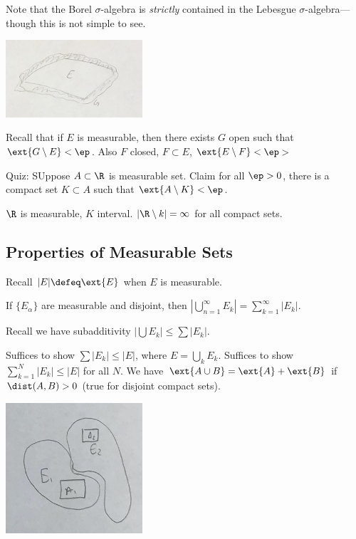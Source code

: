 Note that the Borel $\sigma$-algebra is \emph{strictly} contained in the Lebesgue $\sigma$-algebra---though this is not simple to see. 











   \includegraphics[width=2in]{rep1.png} 


Recall that if $E$ is measurable, then there exists $G$ open such that $\ext{G\setminus E}<\ep$. Also $F$ closed, $F \subset E$, $\ext{E\setminus F}<\ep$> 

Quiz: SUppose $A \subset \R$ is measurable set. Claim for all $\ep>0$, there is a compact set $K \subset A$ such that $\ext{A \setminus K}<\ep$. 

$\R$ is measurable, $K$ interval. $|\R \setminus k|=\infty$ for all compact sets. 




\subsection{Properties of Measurable Sets}

Recall $|E| \defeq \ext{E}$ when $E$ is measurable. 

\begin{thm}
If $\{E_\alpha\}$ are measurable and disjoint, then $\left|\bigcup_{n=1}^\infty E_k \right| = \sum_{k=1}^\infty |E_k|$. 
\end{thm}


Recall we have subadditivity $\left| \bigcup E_k \right| \leq \sum |E_k|$.

\pf Suffices to show $\sum |E_k| \leq |E|$, where $E= \bigcup_k E_k$. Suffices to show $\sum_{k=1}^N |E_k| \leq |E|$ for all $N$. We have $\ext{A \cup B}= \ext{A} + \ext{B}$ if $\dist(A,B)>0$ (true for disjoint compact sets). 


   \includegraphics[width=2in]{rep2.png} 



